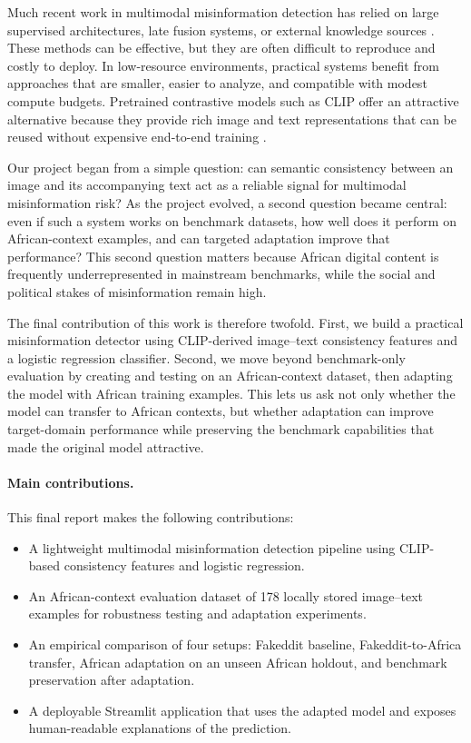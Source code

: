 \documentclass[a4paper,10.5pt,twoside]{article}
\begin{document}
Much recent work in multimodal misinformation detection has relied on large supervised architectures, late fusion systems, or external knowledge sources \cite{khattar2020spotfake,li2024kamp}. These methods can be effective, but they are often difficult to reproduce and costly to deploy. In low-resource environments, practical systems benefit from approaches that are smaller, easier to analyze, and compatible with modest compute budgets. Pretrained contrastive models such as CLIP offer an attractive alternative because they provide rich image and text representations that can be reused without expensive end-to-end training \cite{radford2021clip}.

Our project began from a simple question: can semantic consistency between an image and its accompanying text act as a reliable signal for multimodal misinformation risk? As the project evolved, a second question became central: even if such a system works on benchmark datasets, how well does it perform on African-context examples, and can targeted adaptation improve that performance? This second question matters because African digital content is frequently underrepresented in mainstream benchmarks, while the social and political stakes of misinformation remain high.

The final contribution of this work is therefore twofold. First, we build a practical misinformation detector using CLIP-derived image--text consistency features and a logistic regression classifier. Second, we move beyond benchmark-only evaluation by creating and testing on an African-context dataset, then adapting the model with African training examples. This lets us ask not only whether the model can transfer to African contexts, but whether adaptation can improve target-domain performance while preserving the benchmark capabilities that made the original model attractive.

\paragraph{Main contributions.}
This final report makes the following contributions:
\begin{itemize}[leftmargin=1.5em]
    \item A lightweight multimodal misinformation detection pipeline using CLIP-based consistency features and logistic regression.
    \item An African-context evaluation dataset of 178 locally stored image--text examples for robustness testing and adaptation experiments.
    \item An empirical comparison of four setups: Fakeddit baseline, Fakeddit-to-Africa transfer, African adaptation on an unseen African holdout, and benchmark preservation after adaptation.
    \item A deployable Streamlit application that uses the adapted model and exposes human-readable explanations of the prediction.
\end{itemize}
\end{document}
